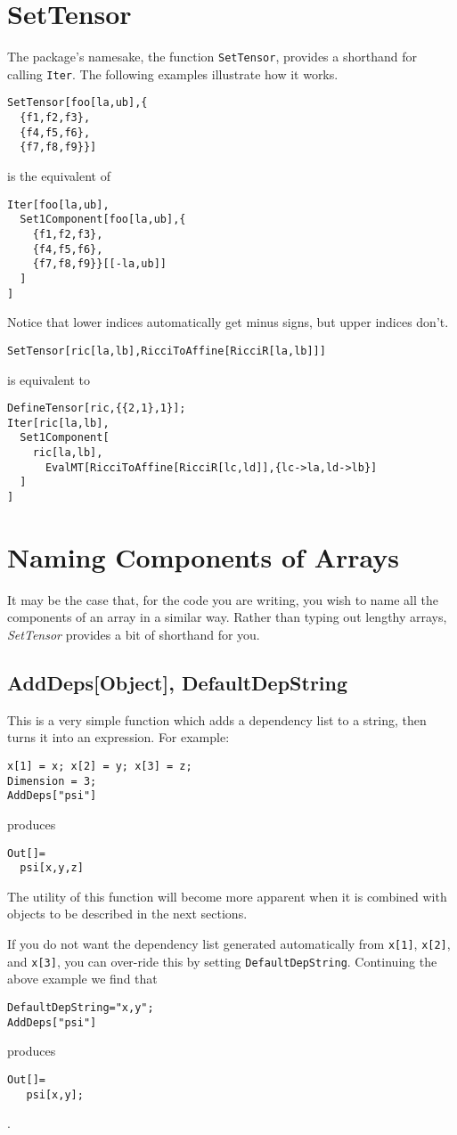 \section{SetTensor}
The package's namesake, the function {\tt SetTensor}, provides
a shorthand for calling {\tt Iter}.  The following examples
illustrate how it works.
\begin{verbatim}
SetTensor[foo[la,ub],{
  {f1,f2,f3},
  {f4,f5,f6},
  {f7,f8,f9}}]
\end{verbatim}
is the equivalent of
\begin{verbatim}
Iter[foo[la,ub],
  Set1Component[foo[la,ub],{
    {f1,f2,f3},
    {f4,f5,f6},
    {f7,f8,f9}}[[-la,ub]]
  ]
]
\end{verbatim}
Notice that lower indices automatically get minus signs, but upper
indices don't.
\begin{verbatim}
SetTensor[ric[la,lb],RicciToAffine[RicciR[la,lb]]]
\end{verbatim}
is equivalent to
\begin{verbatim}
DefineTensor[ric,{{2,1},1}];
Iter[ric[la,lb],
  Set1Component[
    ric[la,lb],
      EvalMT[RicciToAffine[RicciR[lc,ld]],{lc->la,ld->lb}]
  ]
]
\end{verbatim}

\section{Naming Components of Arrays}
It may be the case that, for the code you are writing, you wish to
name all the components of an array in a similar way.  Rather than
typing out lengthy arrays, {\it SetTensor} provides a bit of shorthand
for you.

\subsection{AddDeps[Object], DefaultDepString}
This is a very simple function which adds a dependency list to a
string, then turns it into an expression.  For example:
\begin{verbatim}
x[1] = x; x[2] = y; x[3] = z;
Dimension = 3;
AddDeps["psi"]
\end{verbatim}
produces
\begin{verbatim}
Out[]=
  psi[x,y,z]
\end{verbatim}
The utility of this function will become more apparent when it is
combined with objects to be described in the next sections.

If you do not want the dependency list generated automatically from
{\tt x[1]}, {\tt x[2]}, and {\tt x[3]}, you can over-ride this by
setting {\tt DefaultDepString}.  Continuing the above example we find
that
\begin{verbatim}
DefaultDepString="x,y";
AddDeps["psi"]
\end{verbatim}
produces
\begin{verbatim}
Out[]=
   psi[x,y];
\end{verbatim}.

